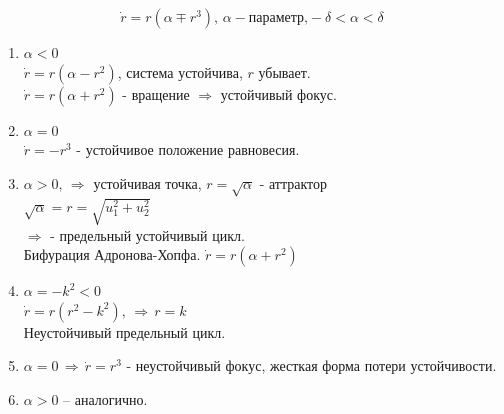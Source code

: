 \[
\dot{r} = r(\alpha \mp r^3), \,
\alpha - \text{параметр,} -\delta < \alpha < \delta 
\]
\begin{enumerate}
\item $\alpha < 0$ \\ 
	\subitem $\dot{r} = r(\alpha -r^2)$, система устойчива, $r$ убывает.\\
	\subitem $\dot{r} = r(\alpha +r^2)$ - вращение $\Rightarrow$ устойчивый фокус.\\
\item $\alpha = 0$ \\
	\subitem $\dot{r} = -r^3$ - устойчивое положение равновесия.\\
\item $\alpha > 0, \, \Rightarrow$ устойчивая точка, $r = \sqrt{\alpha}$ - аттрактор \\ $\sqrt{\alpha} = r = \sqrt{u_1^2 + u_2^2}$\\
$\Rightarrow$ - предельный устойчивый цикл.\\
	\subitem Бифурация Адронова-Хопфа.
	\subitem $\dot{r} = r(\alpha +r^2)$
	
\item $\alpha = -k^2 < 0$\\
$\dot{r} = r(r^2-k^2), \, \Rightarrow \, r = k$ \\
Неустойчивый предельный цикл. 

\item $\alpha = 0 \, \Rightarrow \, \dot{r} = r^3$ - неустойчивый фокус, жесткая форма потери устойчивости.
\item $\alpha > 0$ -- аналогично.
\end{enumerate}

